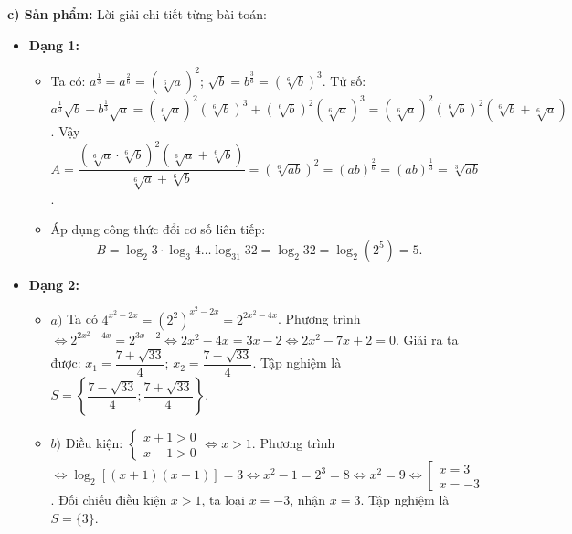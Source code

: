 \documentclass[12pt, a4paper]{article}
\begin{document}
\noindent \textbf{c) Sản phẩm:}
Lời giải chi tiết từng bài toán:
\begin{itemize}[leftmargin=0.6cm]
    \item \textbf{Dạng 1:}
    \begin{itemize}
        \item Ta có: $a^{\frac{1}{3}} = a^{\frac{2}{6}} = \left(\sqrt[6]{a}\right)^2$; $\sqrt{b} = b^{\frac{3}{6}} = \left(\sqrt[6]{b}\right)^3$.
        Tử số: $a^{\frac{1}{3}} \sqrt{b} + b^{\frac{1}{3}} \sqrt{a} = \left(\sqrt[6]{a}\right)^2 \left(\sqrt[6]{b}\right)^3 + \left(\sqrt[6]{b}\right)^2 \left(\sqrt[6]{a}\right)^3 = \left(\sqrt[6]{a}\right)^2 \left(\sqrt[6]{b}\right)^2 (\sqrt[6]{b} + \sqrt[6]{a})$.
        Vậy $A = \dfrac{(\sqrt[6]{a} \cdot \sqrt[6]{b})^2 (\sqrt[6]{a} + \sqrt[6]{b})}{\sqrt[6]{a} + \sqrt[6]{b}} = (\sqrt[6]{ab})^2 = (ab)^{\frac{2}{6}} = (ab)^{\frac{1}{3}} = \sqrt[3]{ab}$.
        \item Áp dụng công thức đổi cơ số liên tiếp:
        $$B = \log_2 3 \cdot \log_3 4 \dots \log_{31} 32 = \log_2 32 = \log_2 (2^5) = 5.$$
    \end{itemize}

    \item \textbf{Dạng 2:}
    \begin{itemize}
        \item $a)$ Ta có $4^{x^2 - 2x} = (2^2)^{x^2 - 2x} = 2^{2x^2 - 4x}$.
        Phương trình $\iff 2^{2x^2 - 4x} = 2^{3x - 2} \iff 2x^2 - 4x = 3x - 2 \iff 2x^2 - 7x + 2 = 0$.
        Giải ra ta được: $x_1 = \dfrac{7 + \sqrt{33}}{4}$; $x_2 = \dfrac{7 - \sqrt{33}}{4}$.
        Tập nghiệm là $S = \left\{\dfrac{7 - \sqrt{33}}{4}; \dfrac{7 + \sqrt{33}}{4}\right\}$.
        \item $b)$ Điều kiện: $\begin{cases} x + 1 > 0 \\ x - 1 > 0 \end{cases} \iff x > 1$.
        Phương trình $\iff \log_2 [(x + 1)(x - 1)] = 3 \iff x^2 - 1 = 2^3 = 8 \iff x^2 = 9 \iff \left[\begin{array}{l} x = 3 \\ x = -3 \end{array}\right.$.
        Đối chiếu điều kiện $x > 1$, ta loại $x = -3$, nhận $x = 3$. Tập nghiệm là $S = \{3\}$.
    \end{itemize}


\end{itemize}
\end{document}
